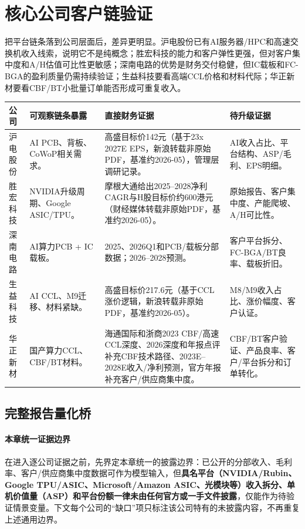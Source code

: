 \section{核心公司客户链验证}

把平台链条落到公司层面后，差异更明显。沪电股份已有AI服务器/HPC和高速交换机收入线索，说明它不是纯概念；胜宏科技的能力和客户弹性更强，但对客户集中度和A/H估值可比性更敏感；深南电路的优势是财务交付稳健，但IC载板和FC-BGA的盈利质量仍需持续验证；生益科技要看高端CCL价格和材料代际；华正新材要看CBF/BT小批量订单能否形成可重复收入。

\begin{exhibitbox}[图表5-3：核心公司链条暴露与验证状态]
\footnotesize
\begin{tabularx}{\textwidth}{L{2.2cm}X X X}
\toprule
\textbf{公司} & \textbf{可观察链条暴露} & \textbf{直接财务证据} & \textbf{待升级证据} \\
\midrule
沪电股份 & AI PCB、背板、CoWoP相关需求。 & 高盛目标价142元（基于23x 2027E EPS，新浪转载非原始PDF，基准约2026-05），管理层调研记录。 & AI收入占比、平台结构、ASP/毛利、EPS明细。 \\
胜宏科技 & NVIDIA升级周期、Google ASIC/TPU。 & 摩根大通给出2025--2028净利CAGR与H股目标价约600港元（财经媒体转载非原始PDF，基准约2026-05）。 & 原始报告、客户集中度、产能爬坡、A/H可比性。 \\
深南电路 & AI算力PCB + IC载板。 & 2025、2026Q1和PCB/载板分部数据；2026--2028预测。 & 客户平台拆分、FC-BGA/BT良率、载板折旧。 \\
生益科技 & AI CCL、M9迁移、材料紧缺。 & 高盛目标价217.6元（基于CCL涨价逻辑，新浪转载非原始PDF，基准约2026-05）。 & M8/M9收入占比、涨价幅度、客户认证。 \\
华正新材 & 国产算力CCL、CBF/BT材料。 & 海通国际和浙商2023 CBF/高速CCL深度、2026深度和年报点评补充CBF技术路径、2023E--2028E收入/净利预测，官方年报补充客户/供应商集中度。 & CBF/BT客户验证、产品良率、客户/平台拆分和订单转化。 \\
\bottomrule
\end{tabularx}
\end{exhibitbox}

\subsection{完整报告量化桥}

\paragraph{本章统一证据边界} 在进入逐公司证据之前，先界定本章统一的披露边界：已公开的分部收入、毛利率、客户/供应商集中度数据可作为模型输入，但\textbf{具名平台（NVIDIA/Rubin、Google TPU/ASIC、Microsoft/Amazon ASIC、光模块等）收入拆分、单机价值量（ASP）和平台份额一律未由任何官方或一手文件披露}，仅能作为待验证情景变量。下文每个公司的``缺口''项只标注该公司特有的未披露内容，不再重复上述通用边界。

